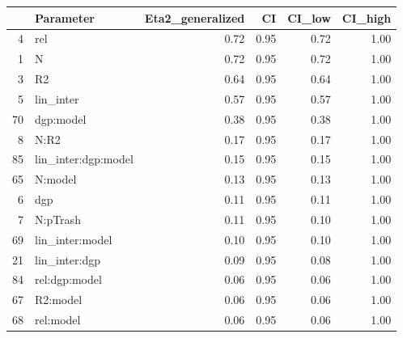 \begin{table}[ht]
\centering
\begin{tabular}{rlrrrr}
  \hline
 & Parameter & Eta2\_generalized & CI & CI\_low & CI\_high \\ 
  \hline
4 & rel & 0.72 & 0.95 & 0.72 & 1.00 \\ 
  1 & N & 0.72 & 0.95 & 0.72 & 1.00 \\ 
  3 & R2 & 0.64 & 0.95 & 0.64 & 1.00 \\ 
  5 & lin\_inter & 0.57 & 0.95 & 0.57 & 1.00 \\ 
  70 & dgp:model & 0.38 & 0.95 & 0.38 & 1.00 \\ 
  8 & N:R2 & 0.17 & 0.95 & 0.17 & 1.00 \\ 
  85 & lin\_inter:dgp:model & 0.15 & 0.95 & 0.15 & 1.00 \\ 
  65 & N:model & 0.13 & 0.95 & 0.13 & 1.00 \\ 
  6 & dgp & 0.11 & 0.95 & 0.11 & 1.00 \\ 
  7 & N:pTrash & 0.11 & 0.95 & 0.10 & 1.00 \\ 
  69 & lin\_inter:model & 0.10 & 0.95 & 0.10 & 1.00 \\ 
  21 & lin\_inter:dgp & 0.09 & 0.95 & 0.08 & 1.00 \\ 
  84 & rel:dgp:model & 0.06 & 0.95 & 0.06 & 1.00 \\ 
  67 & R2:model & 0.06 & 0.95 & 0.06 & 1.00 \\ 
  68 & rel:model & 0.06 & 0.95 & 0.06 & 1.00 \\ 
   \hline
\end{tabular}
\end{table}
